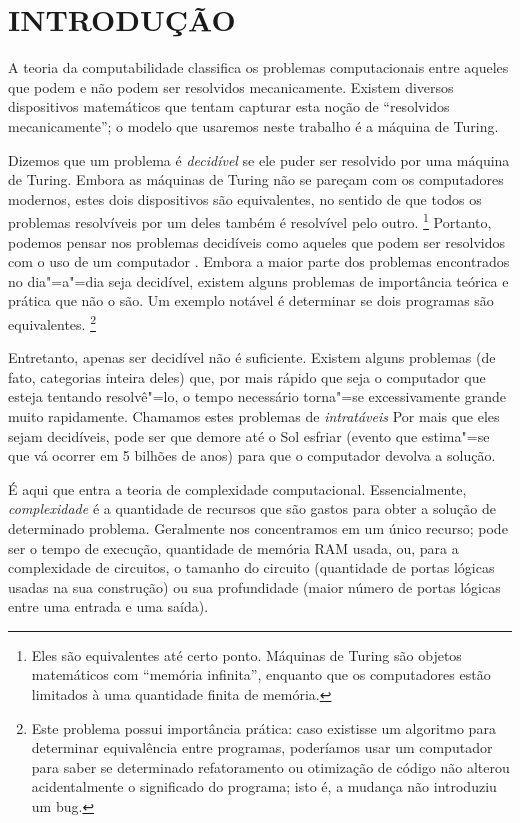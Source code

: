 \chapter{INTRODUÇÃO}

A teoria da computabilidade
classifica os problemas computacionais entre
aqueles que podem e não podem ser resolvidos mecanicamente.
Existem diversos dispositivos matemáticos
que tentam capturar esta noção de
``resolvidos mecanicamente'';
o modelo que usaremos neste trabalho é a máquina de Turing.

Dizemos que um problema é \emph{decidível}
se ele puder ser resolvido por uma máquina de Turing.
Embora as máquinas de Turing
não se pareçam com os computadores modernos,
estes dois dispositivos são equivalentes,
no sentido de que
todos os problemas resolvíveis por um deles
também é resolvível pelo outro.
\footnote{
    Eles são equivalentes até certo ponto.
    Máquinas de Turing são objetos matemáticos
    com ``memória infinita'',
    enquanto que os computadores estão limitados
    à uma quantidade finita de memória.
}
Portanto, podemos pensar nos problemas decidíveis
como aqueles que podem ser resolvidos com o uso de um computador
\cite[p.~307]{HopcroftMotwaniUllman2001}.
Embora a maior parte dos problemas
encontrados no dia"=a"=dia seja decidível,
existem alguns problemas de importância teórica e prática
que não o são.
Um exemplo notável é determinar se dois programas são equivalentes.
\footnote{
    Este problema possui importância prática:
    caso existisse um algoritmo para determinar equivalência entre programas,
    poderíamos usar um computador para saber se
    determinado refatoramento ou otimização de código
    não alterou acidentalmente o significado do programa;
    isto é, a mudança não introduziu um bug.
}

Entretanto,
apenas ser decidível não é suficiente.
Existem alguns problemas
(de fato, categorias inteira deles)
que, por mais rápido que seja o computador
que esteja tentando resolvê"=lo,
o tempo necessário torna"=se excessivamente grande
muito rapidamente.
Chamamos estes problemas de \emph{intratáveis}
\cite[p.~1]{HopcroftMotwaniUllman2001}
Por mais que eles sejam decidíveis,
pode ser que demore até o Sol esfriar
(evento que estima"=se que vá ocorrer em 5 bilhões de anos)
para que o computador devolva a solução.

É aqui que entra a teoria de complexidade computacional.
Essencialmente,
\emph{complexidade}
é a quantidade de recursos que são gastos
para obter a solução de determinado problema.
Geralmente nos concentramos em um único recurso;
pode ser o tempo de execução,
quantidade de memória RAM usada,
ou,
para a complexidade de circuitos,
o tamanho do circuito
(quantidade de portas lógicas usadas na sua construção)
ou sua profundidade
(maior número de portas lógicas entre uma entrada e uma saída).

